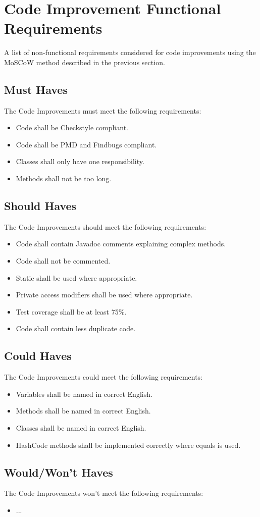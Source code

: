 \section{Code Improvement Functional Requirements}

A list of non-functional requirements considered for code improvements using the MoSCoW method described in the previous section.

\subsection{Must Haves}
The Code Improvements must meet the following requirements:
\begin{itemize}
	\item Code shall be Checkstyle compliant.
	\item Code shall be PMD and Findbugs compliant.
	\item Classes shall only have one responsibility.
	\item Methods shall not be too long.
\end{itemize}

\subsection{Should Haves}
The Code Improvements should meet the following requirements:
\begin{itemize}
	\item Code shall contain Javadoc comments explaining complex methods.
	\item Code shall not be commented.
	\item Static shall be used where appropriate.
	\item Private access modifiers shall be used where appropriate.
	\item Test coverage shall be at least 75\%.
	\item Code shall contain less duplicate code.
\end{itemize}

\subsection{Could Haves}
The Code Improvements could meet the following requirements:
\begin{itemize}
	\item Variables shall be named in correct English.
	\item Methods shall be named in correct English.
	\item Classes shall be named in correct English.
	\item HashCode methods shall be implemented correctly where equals is used.
\end{itemize}

\subsection{Would/Won't Haves}
The Code Improvements won't meet the following requirements:
\begin{itemize}
	\item ...
\end{itemize}